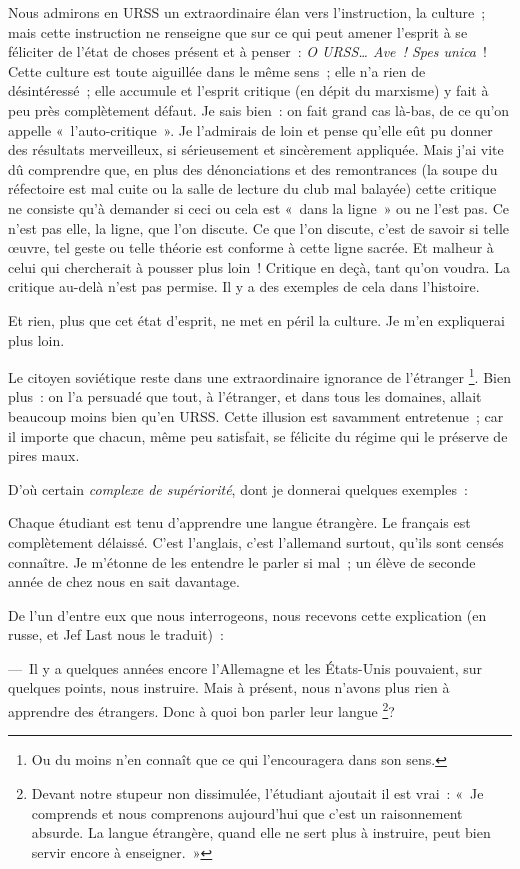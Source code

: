 \documentclass[twoside]{book} %
\begin{document}
Nous admirons en URSS un extraordinaire élan vers l’instruction, la culture ; mais cette instruction ne renseigne que sur ce qui peut amener l’esprit à se féliciter de l’état de choses présent et à penser : \emph{O URSS… Ave ! Spes unica} ! Cette culture est toute aiguillée dans le même sens ; elle n’a rien de désintéressé ; elle accumule et l’esprit critique (en dépit du marxisme) y fait à peu près complètement défaut. Je sais bien : on fait grand cas là-bas, de ce qu’on appelle « l’auto-critique ». Je l’admirais de loin et pense qu’elle eût pu donner des résultats merveilleux, si sérieusement et sincèrement appliquée. Mais j’ai vite dû comprendre que, en plus des dénonciations et des remontrances (la soupe du réfectoire est mal cuite ou la salle de lecture du club mal balayée) cette critique ne consiste qu’à demander si ceci ou cela est « dans la ligne » ou ne l’est pas. Ce n’est pas elle, la ligne, que l’on discute. Ce que l’on discute, c’est de savoir si telle œuvre, tel geste ou telle théorie est conforme à cette ligne sacrée. Et malheur à celui qui chercherait à pousser plus loin ! Critique en deçà, tant qu’on voudra. La critique au-delà n’est pas permise. Il y a des exemples de cela dans l’histoire.\par
Et rien, plus que cet état d’esprit, ne met en péril la culture. Je m’en expliquerai plus loin.\par
Le citoyen soviétique reste dans une extraordinaire ignorance de l’étranger \footnote{Ou du moins n’en connaît que ce qui l’encouragera dans son sens.}. Bien plus : on l’a persuadé que tout, à l’étranger, et dans tous les domaines, allait beaucoup moins bien qu’en URSS. Cette illusion est savamment entretenue ; car il importe que chacun, même peu satisfait, se félicite du régime qui le préserve de pires maux.\par
D’où certain \emph{complexe de supériorité}, dont je donnerai quelques exemples :\par
Chaque étudiant est tenu d’apprendre une langue étrangère. Le français est complètement délaissé. C’est l’anglais, c’est l’allemand surtout, qu’ils sont censés connaître. Je m’étonne de les entendre le parler si mal ; un élève de seconde année de chez nous en sait davantage.\par
De l’un d’entre eux que nous interrogeons, nous recevons cette explication (en russe, et Jef Last nous le traduit) :\par
— Il y a quelques années encore l’Allemagne et les États-Unis pouvaient, sur quelques points, nous instruire. Mais à présent, nous n’avons plus rien à apprendre des étrangers. Donc à quoi bon parler leur langue \footnote{Devant notre stupeur non dissimulée, l’étudiant ajoutait il est vrai : « Je comprends et nous comprenons aujourd’hui que c’est un raisonnement absurde. La langue étrangère, quand elle ne sert plus à instruire, peut bien servir encore à enseigner. »}?\par
\end{document}
